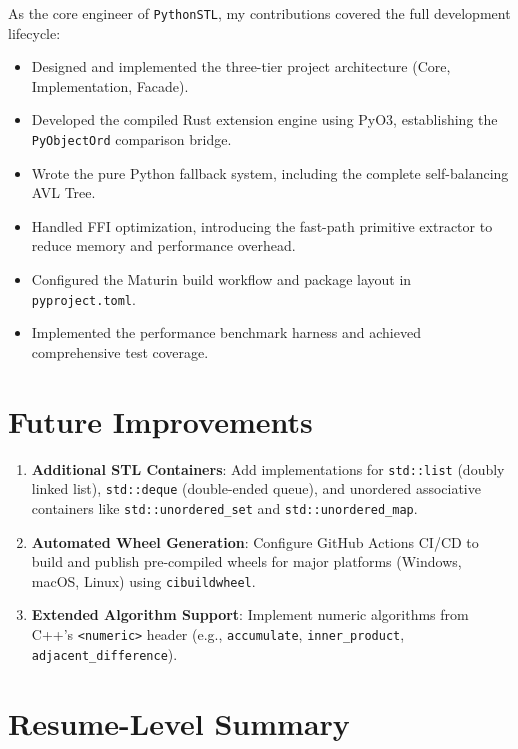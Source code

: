 \documentclass[11pt,a4paper]{article}
\begin{document}
As the core engineer of \texttt{PythonSTL}, my contributions covered the full development lifecycle:
\begin{itemize}
    \item Designed and implemented the three-tier project architecture (Core, Implementation, Facade).
    \item Developed the compiled Rust extension engine using PyO3, establishing the \texttt{PyObjectOrd} comparison bridge.
    \item Wrote the pure Python fallback system, including the complete self-balancing AVL Tree.
    \item Handled FFI optimization, introducing the fast-path primitive extractor to reduce memory and performance overhead.
    \item Configured the Maturin build workflow and package layout in \texttt{pyproject.toml}.
    \item Implemented the performance benchmark harness and achieved comprehensive test coverage.
\end{itemize}

\section{Future Improvements}

\begin{enumerate}
    \item \textbf{Additional STL Containers}:
    Add implementations for \texttt{std::list} (doubly linked list), \texttt{std::deque} (double-ended queue), and unordered associative containers like \texttt{std::unordered\_set} and \texttt{std::unordered\_map}.
    \item \textbf{Automated Wheel Generation}:
    Configure GitHub Actions CI/CD to build and publish pre-compiled wheels for major platforms (Windows, macOS, Linux) using \texttt{cibuildwheel}.
    \item \textbf{Extended Algorithm Support}:
    Implement numeric algorithms from C++'s \texttt{<numeric>} header (e.g., \texttt{accumulate}, \texttt{inner\_product}, \texttt{adjacent\_difference}).
\end{enumerate}

\newpage

\section{Resume-Level Summary}
\end{document}
